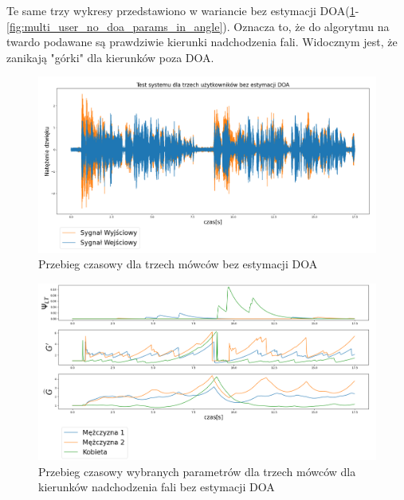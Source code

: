 \noindent Te same trzy wykresy przedstawiono w wariancie bez estymacji DOA(\ref{fig:multi_user_no_doa}-\ref{fig:multi_user_no_doa_params_in_angle}). Oznacza to, że do algorytmu na twardo podawane są prawdziwie kierunki nadchodzenia fali. Widocznym jest, że zanikają "górki" dla kierunków poza DOA.

\begin{figure}[h!]
    \centering
    \includegraphics[width=\textwidth]{Images/multi_user_no_doa.png}
    \caption{Przebieg czasowy dla trzech mówców bez estymacji DOA}
    \label{fig:multi_user_no_doa}
\end{figure}

\begin{figure}[h!]
    \centering
    \includegraphics[width=\textwidth]{Images/multi_user_params_in_time.png}
    \caption{Przebieg czasowy wybranych parametrów dla trzech mówców dla kierunków nadchodzenia fali bez estymacji DOA}
    \label{fig:multi_user_no_doa_params_in_time}
\end{figure}

